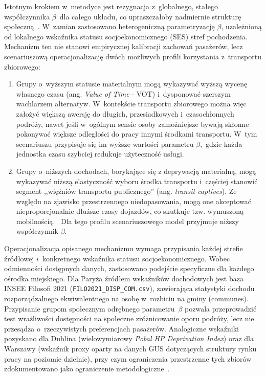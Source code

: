 \documentclass{pracamgr}
\begin{document}
Istotnym krokiem w~metodyce jest rezygnacja z~globalnego, stałego współczynnika $\beta$~dla całego układu, co upraszczałoby nadmiernie strukturę społeczną~\cite{gravity2, capetown}. W~zamian zastosowano heterogeniczną parametryzację $\beta$, uzależnioną od lokalnego wskaźnika statusu socjoekonomicznego (SES) stref pochodzenia. Mechanizm ten nie stanowi empirycznej kalibracji zachowań pasażerów, lecz scenariuszową operacjonalizację dwóch możliwych profili korzystania z~transportu zbiorowego:
\begin{enumerate}
    \item Grupy o~wyższym statusie materialnym mogą wykazywać wyższą wycenę własnego czasu (ang. \textit{Value of Time} - VOT) i~dysponować szerszym wachlarzem alternatyw. W~kontekście transportu zbiorowego można więc założyć większą awersję do długich, przesiadkowych i~czasochłonnych podróży, nawet jeśli w~ogólnym sensie osoby zamożniejsze bywają skłonne pokonywać większe odległości do pracy innymi środkami transportu. W~tym scenariuszu przypisuje się im wyższe wartości parametru $\beta$,~gdzie każda jednostka czasu szybciej redukuje użyteczność usługi.
    \item Grupy o~niższych dochodach, borykające się z deprywacją materialną, mogą wykazywać niższą elastyczność wyboru środka transportu i~częściej stanowić segment ,,więźniów transportu publicznego'' (ang. \textit{transit captives}). Ze względu na zjawisko przestrzennego niedopasowania, mogą one akceptować nieproporcjonalnie dłuższe czasy dojazdów, co skutkuje tzw. wymuszoną mobilnością.~\cite{capetown} Dla tego profilu scenariuszowego model przyjmuje niższy współczynnik $\beta$.
\end{enumerate}

Operacjonalizacja opisanego mechanizmu wymaga przypisania każdej strefie źródłowej $i$~konkretnego wskaźnika statusu socjoekonomicznego. Wobec odmienności dostępnych danych, zastosowano podejście specyficzne dla każdego ośrodka miejskiego. Dla Paryża źródłem wskaźników dochodowych jest baza INSEE Filosofi 2021 (\texttt{FILO2021\_DISP\_COM.csv}), zawierająca statystyki dochodu rozporządzalnego ekwiwalentnego na osobę w~rozbiciu na gminy (communes). Przypisanie grupom społecznym odrębnego parametru~$\beta$ pozwala przeprowadzić test wrażliwości dostępności na społeczne zróżnicowanie oporu podróży, lecz nie przesądza o~rzeczywistych preferencjach pasażerów. Analogiczne wskaźniki pozyskano dla Dublina (wielowymiarowy \textit{Pobal HP Deprivation Index}) oraz dla Warszawy (wskaźnik proxy oparty na danych GUS dotyczących struktury rynku pracy na poziomie dzielnic), przy czym ograniczenia przestrzenne tych zbiorów zdokumentowano jako ograniczenie metodologiczne~\cite{capetown, framework}.
\end{document}
